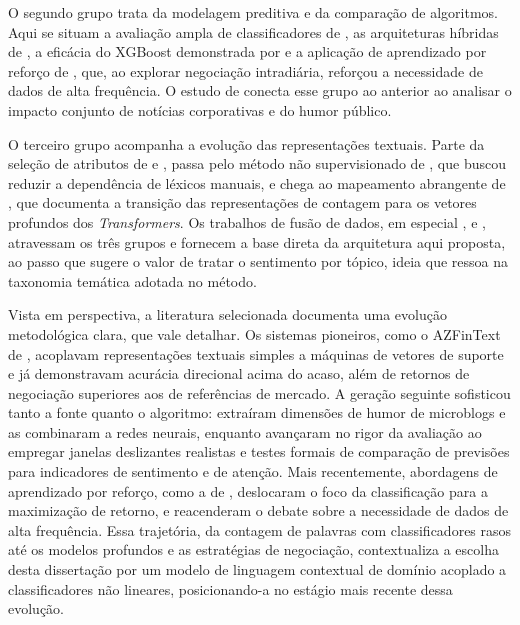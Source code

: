 O segundo grupo trata da modelagem preditiva e da comparação de algoritmos. Aqui se situam a avaliação ampla de classificadores de , as arquiteturas híbridas de , a eficácia do XGBoost demonstrada por  e a aplicação de aprendizado por reforço de , que, ao explorar negociação intradiária, reforçou a necessidade de dados de alta frequência. O estudo de  conecta esse grupo ao anterior ao analisar o impacto conjunto de notícias corporativas e do humor público.

O terceiro grupo acompanha a evolução das representações textuais. Parte da seleção de atributos de  e , passa pelo método não supervisionado de , que buscou reduzir a dependência de léxicos manuais, e chega ao mapeamento abrangente de , que documenta a transição das representações de contagem para os vetores profundos dos \textit{Transformers}. Os trabalhos de fusão de dados, em especial ,  e , atravessam os três grupos e fornecem a base direta da arquitetura aqui proposta, ao passo que  sugere o valor de tratar o sentimento por tópico, ideia que ressoa na taxonomia temática adotada no método.

Vista em perspectiva, a literatura selecionada documenta uma evolução metodológica clara, que vale detalhar. Os sistemas pioneiros, como o AZFinText de , acoplavam representações textuais simples a máquinas de vetores de suporte e já demonstravam acurácia direcional acima do acaso, além de retornos de negociação superiores aos de referências de mercado. A geração seguinte sofisticou tanto a fonte quanto o algoritmo:  extraíram dimensões de humor de microblogs e as combinaram a redes neurais, enquanto  avançaram no rigor da avaliação ao empregar janelas deslizantes realistas e testes formais de comparação de previsões para indicadores de sentimento e de atenção. Mais recentemente, abordagens de aprendizado por reforço, como a de , deslocaram o foco da classificação para a maximização de retorno, e reacenderam o debate sobre a necessidade de dados de alta frequência. Essa trajetória, da contagem de palavras com classificadores rasos até os modelos profundos e as estratégias de negociação, contextualiza a escolha desta dissertação por um modelo de linguagem contextual de domínio acoplado a classificadores não lineares, posicionando-a no estágio mais recente dessa evolução.


